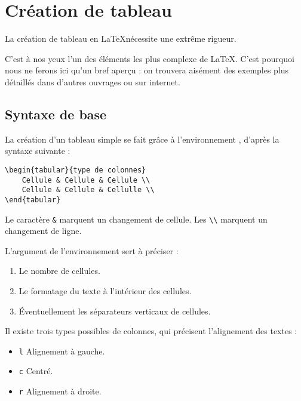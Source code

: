 \section{Création de tableau}

\begin{attention}
La création de tableau en \LaTeX nécessite  une extrême rigueur. 

C'est à nos yeux l'un des éléments les plus complexe de \LaTeX. C'est pourquoi nous ne ferons ici qu'un bref aperçu : on trouvera aisément des exemples plus détaillés dans d'autres ouvrages ou sur internet.

\end{attention}

\subsection{Syntaxe de base}

La création d'un tableau simple se fait grâce à l'environnement , d'après la syntaxe suivante :

\begin{verbatim}
\begin{tabular}{type de colonnes}
	Cellule & Cellule & Cellule \\
	Cellule & Cellule & Cellulle \\
\end{tabular}
\end{verbatim}

Le caractère \verb|&| marquent un changement de cellule. Les \verb|\\| marquent un changement de ligne.

L'argument  de l'environnement  sert à préciser :
\begin{enumerate}
	\item Le nombre de cellules.
	\item Le formatage du texte à l'intérieur des cellules.
	\item Éventuellement les séparateurs verticaux de cellules.
	
\end{enumerate}

Il existe trois types possibles de colonnes,  qui précisent l'alignement des textes :

\begin{itemize}
	\item \verb|l| Alignement à gauche.
	\item \verb|c| Centré.
	\item \verb|r| Alignement à droite.
\end{itemize}

